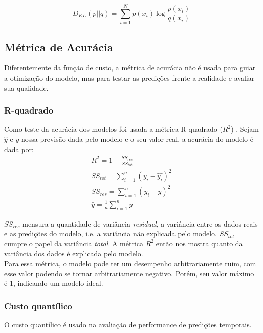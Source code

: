 \[D_{KL}(p||q) = \sum_{i=1}^{N}p(x_{i}) \log \frac{p(x_{i})}{q(x_{i})}​\]



\subsection{Métrica de Acurácia}

Diferentemente da função de custo, a métrica de acurácia não é usada para guiar a otimização do modelo,
mas para testar as predições frente a realidade e avaliar sua qualidade. \\

\subsubsection{R-quadrado}
Como teste da acurácia dos modelos foi usada a métrica R-quadrado ($R^2$) \citep{cohen}. Sejam $\hat{y}$ e $y$ nossa previsão dada pelo modelo e o seu valor real, a acurácia do modelo é dada por:\\

\begin{align}
&R^2 = 1 - \frac{SS_{res}}{SS_{tot}} &\\
&SS_{tot} = \sum^n_{i=1} (y_i- \hat{y_i})^2 &\\
&SS_{res} = \sum^n_{i=1} (y_i - \bar{y})^2 &\\
&\bar{y} = \frac{1}{n} \sum^n_{i=1} y &
\end{align}

$SS_{res}$ mensura a quantidade de variância \textit{residual}, a
variância entre os dados reais e as predições do modelo, i.e. a variância não
explicada pelo modelo. $SS_{tot}$ cumpre o papel da variância \textit{total}. A métrica $R^2$
então nos mostra quanto da variância dos dados é explicada pelo modelo. \\

Para essa métrica, o modelo pode ter um desempenho arbitrariamente ruim, com esse valor
podendo se tornar arbitrariamente negativo. Porém, seu valor máximo é 1,
indicando um modelo ideal.\\


\subsubsection{Custo quantílico}

O custo quantílico \citep{deepar} é usado na avaliação de performance de
predições temporais. \\

